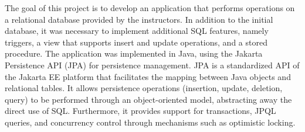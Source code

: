 \abstractEN %

The goal of this project is to develop an application that performs operations on a relational database provided by the instructors. In addition to the initial database, it was necessary to implement additional SQL features, namely triggers, a view that supports insert and update operations, and a stored procedure.
The application was implemented in Java, using the Jakarta Persistence API (JPA) for persistence management.
JPA is a standardized API of the Jakarta EE platform that facilitates the mapping between Java objects and relational tables. It allows persistence operations (insertion, update, deletion, query) to be performed through an object-oriented model, abstracting away the direct use of SQL. Furthermore, it provides support for transactions, JPQL queries, and concurrency control through mechanisms such as optimistic locking.
